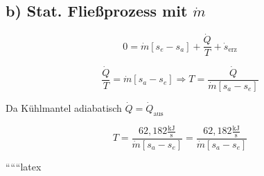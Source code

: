 \subsection*{b) Stat. Fließprozess mit $\dot{m}$}

\[
0 = \dot{m} [s_e - s_a] + \frac{\dot{Q}}{T} + \dot{s}_{\text{erz}}
\]

\[
\frac{\dot{Q}}{T} = \dot{m} [s_a - s_e] \Rightarrow T = \frac{\dot{Q}}{\dot{m} [s_a - s_e]}
\]

Da Kühlmantel adiabatisch $\dot{Q} = \dot{Q}_{\text{aus}}$

\[
T = \frac{62{,}182 \frac{\text{kJ}}{\text{s}}}{\dot{m} [s_a - s_e]} = \frac{62{,}182 \frac{\text{kJ}}{\text{s}}}{\dot{m} [s_a - s_e]}
\]

``````latex